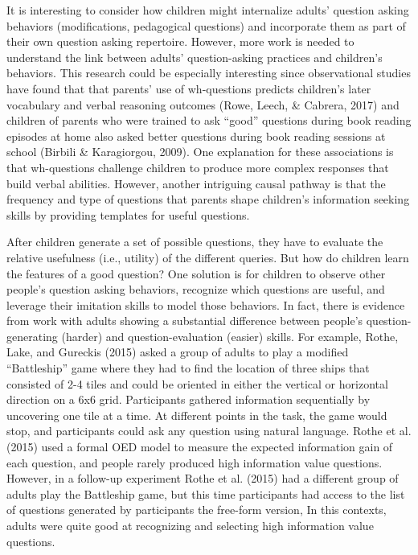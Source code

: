\documentclass[english,floatsintext,man]{apa6}
\theoremstyle{definition}
\theoremstyle{definition}
\theoremstyle{definition}
\theoremstyle{remark}
\begin{document}
It is interesting to consider how children might internalize adults'
question asking behaviors (modifications, pedagogical questions) and
incorporate them as part of their own question asking repertoire.
However, more work is needed to understand the link between adults'
question-asking practices and children's behaviors. This research could
be especially interesting since observational studies have found that
that parents' use of wh-questions predicts children's later vocabulary
and verbal reasoning outcomes (Rowe, Leech, \& Cabrera, 2017) and
children of parents who were trained to ask \enquote{good} questions
during book reading episodes at home also asked better questions during
book reading sessions at school (Birbili \& Karagiorgou, 2009). One
explanation for these associations is that wh-questions challenge
children to produce more complex responses that build verbal abilities.
However, another intriguing causal pathway is that the frequency and
type of questions that parents shape children's information seeking
skills by providing templates for useful questions.

After children generate a set of possible questions, they have to
evaluate the relative usefulness (i.e., utility) of the different
queries. But how do children learn the features of a good question? One
solution is for children to observe other people's question asking
behaviors, recognize which questions are useful, and leverage their
imitation skills to model those behaviors. In fact, there is evidence
from work with adults showing a substantial difference between people's
question-generating (harder) and question-evaluation (easier) skills.
For example, Rothe, Lake, and Gureckis (2015) asked a group of adults to
play a modified \enquote{Battleship} game where they had to find the
location of three ships that consisted of 2-4 tiles and could be
oriented in either the vertical or horizontal direction on a 6x6 grid.
Participants gathered information sequentially by uncovering one tile at
a time. At different points in the task, the game would stop, and
participants could ask any question using natural language. Rothe et al.
(2015) used a formal OED model to measure the expected information gain
of each question, and people rarely produced high information value
questions. However, in a follow-up experiment Rothe et al. (2015) had a
different group of adults play the Battleship game, but this time
participants had access to the list of questions generated by
participants the free-form version, In this contexts, adults were quite
good at recognizing and selecting high information value questions.
\end{document}
